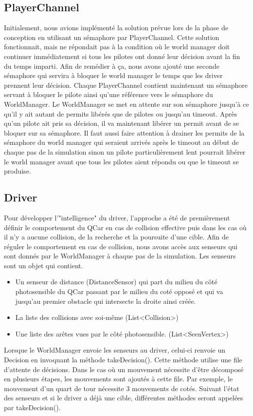 \documentclass[a4paper, 12pt]{article}
\begin{document}
\subsection{PlayerChannel}
Initialement, nous avions implémenté la solution prévue lors de la phase de conception en utilisant un sémaphore par PlayerChannel. Cette solution fonctionnait, mais ne répondait pas à la condition où le world manager doit continuer immédiatement si tous les pilotes ont donné leur décision avant la fin du temps imparti. Afin de remédier à ça, nous avons ajouté une seconde sémaphore qui servira à bloquer le world manager le temps que les driver prennent leur décision. Chaque PlayerChannel contient maintenant un sémaphore servant à bloquer le pilote ainsi qu'une référence vers le sémaphore du WorldManager. Le WorldManager se met en attente sur son sémaphore jusqu'à ce qu'il y ait autant de permits libérés que de pilotes ou jusqu'au timeout. Après qu'un pilote ait pris sa décision, il va maintenant libérer un permit avant de se bloquer sur sa sémaphore. Il faut aussi faire attention à drainer les permits de la sémaphore du world manager qui seraient arrivés après le timeout au début de chaque pas de la simulation sinon un pilote particulièrement lent pourrait libérer le world manager avant que tous les pilotes aient répondu ou que le timeout se produise.
\subsection{Driver}
Pour développer l'"intelligence" du driver, l'approche a été de premièrement définir le comportement du QCar en cas de collision effective puis dans les cas où il n'y a aucune collision, de la recherche et la poursuite d'une cible. Afin de réguler le comportement en cas de collision, nous avons accès aux senseurs qui sont donnés par le WorldManager à chaque pas de la simulation. Les senseurs sont un objet qui contient. \begin{itemize}
\item Un senseur de distance (DistanceSensor) qui part du milieu du côté photosensible du QCar passant par le milieu du coté opposé et qui va jusqu'au premier obstacle qui intersecte la droite ainsi créée. 
\item La liste des collisions avec soi-même (List<Collision>)
\item Une liste des arêtes vues par le côté photosensible. (List<SeenVertex>)
\end{itemize}
Lorsque le WorldManager envoie les senseurs au driver, celui-ci renvoie un Decision en invoquant la méthode takeDecision(). Cette méthode utilise une file d'attente de décisions. Dans le cas où un mouvement nécessite d'être décomposé en plusieurs étapes, les mouvements sont ajoutés à cette file. Par exemple, le mouvement d'un quart de tour nécessite 3 mouvements de cotés. Suivant l'état des senseurs et si le driver a déjà une cible, différentes méthodes seront appelées par takeDecision().
\end{document}
